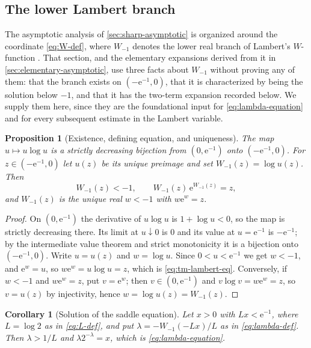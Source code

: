 \documentclass[11pt,oneside]{article}
\newtheorem{proposition}[theorem]{Proposition}
\newtheorem{corollary}[theorem]{Corollary}
\theoremstyle{definition}
\theoremstyle{remark}
\newcommand{\e}{\mathrm e}
\begin{document}
\subsection{The lower Lambert branch}
\label{tm:sub-lambert}

The asymptotic analysis of \cref{sec:sharp-asymptotic} is organized around the coordinate
\eqref{eq:W-def}, where $W_{-1}$ denotes the lower real branch of Lambert's
$W$-function \cite{corless1996}.  That section, and the elementary expansions derived from
it in \cref{sec:elementary-asymptotic}, use three facts about $W_{-1}$ without proving any
of them: that the branch exists on $(-\e^{-1},0)$, that it is characterized by being the
solution below $-1$, and that it has the two-term expansion recorded below.  We supply them
here, since they are the foundational input for \eqref{eq:lambda-equation} and for every
subsequent estimate in the Lambert variable.

\begin{proposition}[Existence, defining equation, and uniqueness]
\label{thm:tm-lambert-branch}
The map $u\mapsto u\log u$ is a strictly decreasing bijection from $(0,\e^{-1})$ onto
$(-\e^{-1},0)$.  For $z\in(-\e^{-1},0)$ let $u(z)$ be its unique preimage and set
$W_{-1}(z)=\log u(z)$.  Then
\begin{equation}
 W_{-1}(z)<-1,
 \qquad
 W_{-1}(z)\,\e^{W_{-1}(z)}=z,                              \label{eq:tm-lambert-eq}
\end{equation}
and $W_{-1}(z)$ is the unique real $w<-1$ with $w\e^w=z$.
\end{proposition}

\begin{proof}
On $(0,\e^{-1})$ the derivative of $u\log u$ is $1+\log u<0$, so the map is strictly
decreasing there.  Its limit at $u\downarrow0$ is $0$ and its value at $u=\e^{-1}$ is
$-\e^{-1}$; by the intermediate value theorem and strict monotonicity it is a bijection onto
$(-\e^{-1},0)$.  Write $u=u(z)$ and $w=\log u$.  Since $0<u<\e^{-1}$ we get $w<-1$, and
$\e^w=u$, so $w\e^w=u\log u=z$, which is \eqref{eq:tm-lambert-eq}.  Conversely, if $w<-1$
and $w\e^w=z$, put $v=\e^w$; then $v\in(0,\e^{-1})$ and $v\log v=w\e^w=z$, so $v=u(z)$ by
injectivity, hence $w=\log u(z)=W_{-1}(z)$.
\end{proof}

\begin{corollary}[Solution of the saddle equation]
\label{thm:tm-lambert-lambda}
Let $x>0$ with $Lx<\e^{-1}$, where $L=\log2$ as in \eqref{eq:L-def}, and put
$\lambda=-W_{-1}(-Lx)/L$ as in \eqref{eq:lambda-def}.  Then $\lambda>1/L$ and
$\lambda2^{-\lambda}=x$, which is \eqref{eq:lambda-equation}.
\end{corollary}
\end{document}
